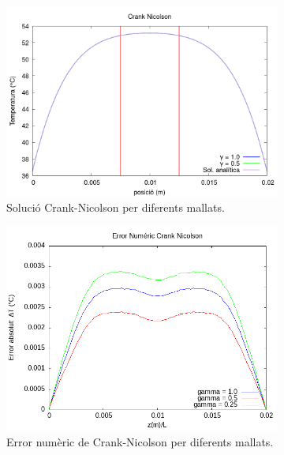 \documentclass[11pt]{article}
\begin{document}
\begin{figure}[hbt!]
    \centering
    \begin{subfigure}{0.3\textwidth}
        \centering
        \includegraphics[width=\textwidth]{cranc2gamma.png}
        \caption{Solució Crank-Nicolson per diferents mallats.}
    \end{subfigure}
    \hspace{0.025\textwidth}
    \begin{subfigure}{0.3\textwidth}
        \centering
        \includegraphics[width=\textwidth]{errcranc3gamma.png}
        \caption{Error numèric de Crank-Nicolson per diferents mallats.}
    \end{subfigure}
    \hspace{0.025\textwidth}
    \begin{subfigure}{0.3\textwidth}

\end{subfigure}
\end{figure}
\end{document}
